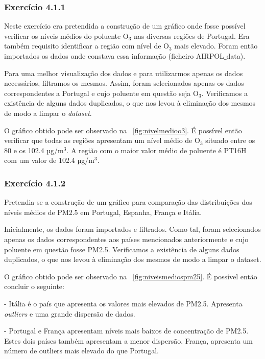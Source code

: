 \documentclass[conference]{IEEEtran}
\begin{document}
\subsubsection{\textbf{Exercício 4.1.1}}

Neste exercício era pretendida a construção de um gráfico onde fosse possível verificar os níveis médios do poluente O$_3$ nas diversas regiões de Portugal. Era também requisito identificar a região com nível de O$_3$ mais elevado. Foram então importados os dados onde constava essa informação (ficheiro AIRPOL$\_$data).  

Para uma melhor visualização dos dados e para utilizarmos apenas os dados necessários, filtramos os mesmos. Assim, foram selecionados apenas os dados correspondentes a Portugal e cujo poluente em questão seja O$_3$. Verificamos a existência de alguns dados duplicados, o que nos levou à eliminação dos mesmos de modo a limpar o \textit{dataset}.
 
O gráfico obtido pode ser observado na \figurename~\ref{fig:nivelmedioo3}. É possível então verificar que todas as regiões apresentam um nível médio de O$_3$ situado entre os 80 e os 102.4 µg/m$^3$. A região com o maior valor médio de poluente é PT16H com um valor de 102.4 µg/m$^3$.


\medskip
\subsubsection{\textbf{Exercício 4.1.2}}

Pretendia-se a construção de um gráfico para comparação das distribuições dos níveis médios de PM2.5 em Portugal, Espanha, França e Itália. 

Inicialmente, os dados foram importados e filtrados. Como tal, foram selecionados apenas os dados correspondentes aos países mencionados anteriormente e cujo poluente em questão fosse PM2.5. Verificamos a existência de alguns dados duplicados, o que nos levou à eliminação dos mesmos de modo a limpar o dataset.

O gráfico obtido pode ser observado na \figurename~\ref{fig:niveismediospm25}. É possível então concluir o seguinte:

- Itália é o país que apresenta os valores mais elevados de PM2.5. Apresenta \textit{outliers} e uma grande dispersão de dados.

- Portugal e França apresentam níveis mais baixos de concentração de PM2.5. Estes dois países também apresentam a menor dispersão. França, apresenta um número de outliers mais elevado do que Portugal.
\end{document}
